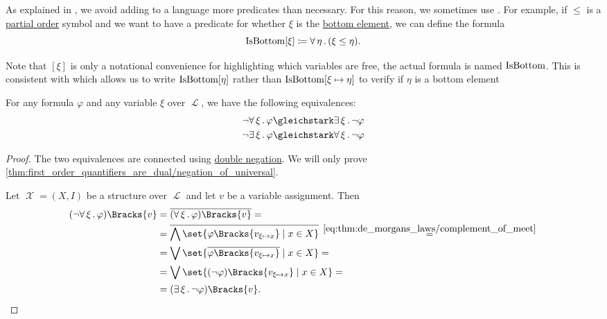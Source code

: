 \begin{remark}\label{rem:predicate_formula}
  As explained in , we avoid adding to a language more predicates than necessary. For this reason, we sometimes use . For example, if \( \leq \) is a \hyperref[def:poset/theory]{partial order} symbol and we want to have a predicate for whether \( \xi \) is the \hyperref[def:poset_extremal_points/top_and_bottom]{bottom element}, we can define the formula
  \begin{equation}\label{rem:predicate_formula/bottom}
    \operatorname{IsBottom}[\xi] \coloneqq \forall \thinspace \eta \thinspace . \thinspace (\xi \leq \eta).
  \end{equation}

  Note that \( [\xi] \) is only a notational convenience for highlighting which variables are free, the actual formula is named \( \operatorname{IsBottom} \). This is consistent with  which allows us to write \( \operatorname{IsBottom}[\eta] \) rather than \( \operatorname{IsBottom}[\xi \mapsto \eta] \) to verify if \( \eta \) is a bottom element
\end{remark}

\begin{proposition}\label{thm:first_order_quantifiers_are_dual}
  For any formula \( \varphi \) and any variable \( \xi \) over \( \mscrL \), we have the following equivalences:
  \begin{align}
    \neg \qforall \xi \varphi &\gleichstark \qexists \xi \neg \varphi \label{thm:first_order_quantifiers_are_dual/negation_of_universal} \\
    \neg \qexists \xi \varphi &\gleichstark \qforall \xi \neg \varphi \label{thm:first_order_quantifiers_are_dual/negation_of_existential}
  \end{align}
\end{proposition}
\begin{proof}
  The two equivalences are connected using \hyperref[thm:boolean_equivalences/double_negation]{double negation}. We will only prove \eqref{thm:first_order_quantifiers_are_dual/negation_of_universal}.

  Let \( \mscrX = (X, I) \) be a structure over \( \mscrL \) and let \( v \) be a variable assignment. Then
  \begin{align*}
    (\neg \qforall \xi \varphi)\Bracks{v}
    &=
    \overline{(\qforall \xi \varphi)\Bracks{v}}
    = \\ &=
    \overline{\bigwedge\set{ \varphi\Bracks{v_{\xi \mapsto x}} \given x \in X }}
    \reloset {\eqref{eq:thm:de_morgans_laws/complement_of_meet}} = \\ &=
    \bigvee\set{ \overline{\varphi\Bracks{v_{\xi \mapsto x}}} \given x \in X }
    = \\ &=
    \bigvee\set{ (\neg \varphi)\Bracks{v_{\xi \mapsto x}} \given x \in X }
    = \\ &=
    (\qexists \xi \neg \varphi)\Bracks{v}.
  \end{align*}
\end{proof}

